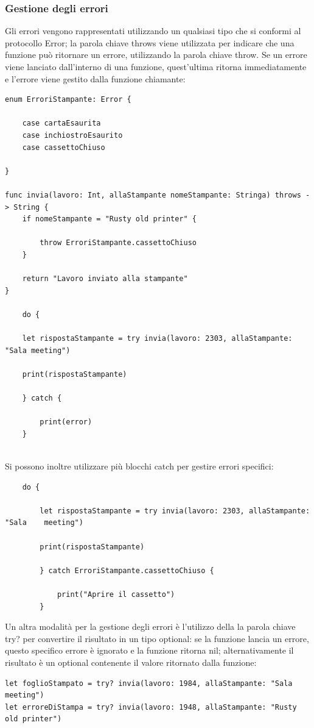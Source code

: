 \subsubsection{Gestione degli errori}
Gli errori vengono rappresentati utilizzando un qualsiasi tipo che si conformi al protocollo Error; la parola chiave throws viene utilizzata per indicare che una funzione può ritornare un errore, utilizzando la parola chiave throw. Se un errore viene lanciato dall'interno di una funzione, quest'ultima ritorna immediatamente e l'errore viene gestito dalla funzione chiamante:
\lstset{language=[Objective]C, breakindent=40pt, breaklines}
\begin{lstlisting}
enum ErroriStampante: Error {

	case cartaEsaurita
	case inchiostroEsaurito
	case cassettoChiuso
	
}

func invia(lavoro: Int, allaStampante nomeStampante: Stringa) throws -> String {
	if nomeStampante = "Rusty old printer" {
		
		throw ErroriStampante.cassettoChiuso
	}

	return "Lavoro inviato alla stampante"
}

	do {
	
	let rispostaStampante = try invia(lavoro: 2303, allaStampante: "Sala meeting")
	
	print(rispostaStampante)
	
	} catch {
		
		print(error)
	}
	
\end{lstlisting}
Si possono inoltre utilizzare più blocchi catch per gestire errori specifici:
\lstset{language=[Objective]C, breakindent=40pt, breaklines}
\begin{lstlisting}
	do {
	
		let rispostaStampante = try invia(lavoro: 2303, allaStampante: "Sala 	meeting")
	
		print(rispostaStampante)
	
		} catch ErroriStampante.cassettoChiuso {
		
			print("Aprire il cassetto")
		}
\end{lstlisting}
Un altra modalità per la gestione degli errori è l'utilizzo della la parola chiave try? per convertire il risultato in un tipo optional: se la funzione lancia un errore, questo specifico errore è ignorato e la funzione ritorna nil; alternativamente il risultato è un optional contenente il valore ritornato dalla funzione:
\lstset{language=[Objective]C, breakindent=40pt, breaklines}
\begin{lstlisting}
let foglioStampato = try? invia(lavoro: 1984, allaStampante: "Sala meeting")
let erroreDiStampa = try? invia(lavoro: 1948, allaStampante: "Rusty old printer")
\end{lstlisting}
